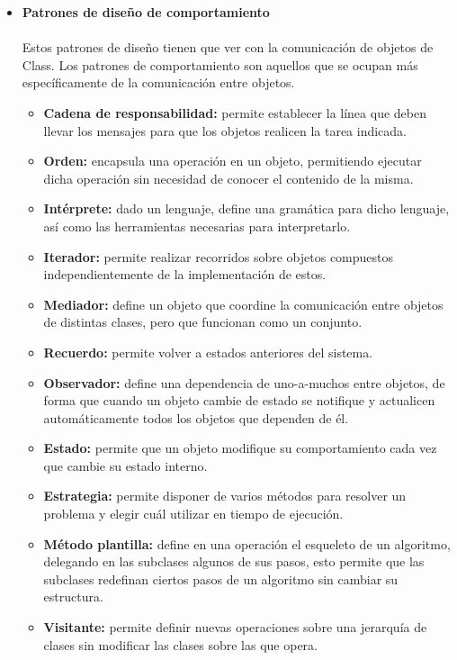 \documentclass[twoside,twocolumn]{article}
\begin{document}
\begin{itemize}
	\item \textbf{Patrones de diseño de comportamiento}
	\\
	\\Estos patrones de diseño tienen que ver con la comunicación de objetos de Class. Los patrones de comportamiento son aquellos que se ocupan más específicamente de la comunicación entre objetos.\cite{r}
	\begin{itemize}
		\item \textbf{Cadena de responsabilidad:} permite establecer la línea que deben llevar los mensajes para que los objetos realicen la tarea indicada.
		\item \textbf{Orden:} encapsula una operación en un objeto, permitiendo ejecutar dicha operación sin necesidad de conocer el contenido de la misma.
		\item \textbf{Intérprete:} dado un lenguaje, define una gramática para dicho lenguaje, así como las herramientas necesarias para interpretarlo.
		\item \textbf{Iterador:} permite realizar recorridos sobre objetos compuestos independientemente de la implementación de estos.
		\item \textbf{Mediador:} define un objeto que coordine la comunicación entre objetos de distintas clases, pero que funcionan como un conjunto.
		\item \textbf{Recuerdo:} permite volver a estados anteriores del sistema.
		\item \textbf{Observador:} define una dependencia de uno-a-muchos entre objetos, de forma que cuando un objeto cambie de estado se notifique y actualicen automáticamente todos los objetos que dependen de él.
		\item \textbf{Estado:} permite que un objeto modifique su comportamiento cada vez que cambie su estado interno.
		\item \textbf{Estrategia:} permite disponer de varios métodos para resolver un problema y elegir cuál utilizar en tiempo de ejecución.
		\item \textbf{Método plantilla:} define en una operación el esqueleto de un algoritmo, delegando en las subclases algunos de sus pasos, esto permite que las subclases redefinan ciertos pasos de un algoritmo sin cambiar su estructura.
		\item \textbf{Visitante:} permite definir nuevas operaciones sobre una jerarquía de clases sin modificar las clases sobre las que opera.
	\end{itemize}
\end{itemize}
\end{document}
